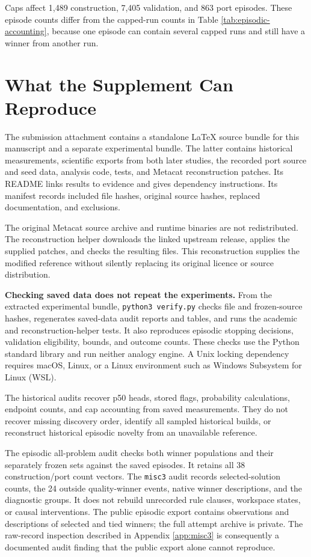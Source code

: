\documentclass[10pt,letterpaper]{article}
\begin{document}
Caps affect 1,489 construction, 7,405 validation, and 863 port episodes. These episode
counts differ from the capped-run counts in Table \ref{tab:episodic-accounting}, because
one episode can contain several capped runs and still have a winner from another run.

\clearpage

\section{What the Supplement Can Reproduce}\label{app:artifacts}

The submission attachment contains a standalone LaTeX source bundle for this manuscript
and a separate experimental bundle. The latter contains historical measurements,
scientific exports from both later studies, the recorded port source and seed data,
analysis code, tests, and Metacat reconstruction patches. Its README links results to
evidence and gives dependency instructions. Its manifest records included file hashes,
original source hashes, replaced documentation, and exclusions.

The original Metacat source archive and runtime binaries are not redistributed. The
reconstruction helper downloads the linked upstream release, applies the supplied patches,
and checks the resulting files. This reconstruction supplies the modified reference
without silently replacing its original licence or source distribution.

\textbf{Checking saved data does not repeat the experiments.} From the extracted
experimental bundle, \texttt{python3\ verify.py} checks file and frozen-source hashes,
regenerates saved-data audit reports and tables, and runs the academic and
reconstruction-helper tests. It also reproduces episodic stopping decisions, validation
eligibility, bounds, and outcome counts. These checks use the Python standard library and
run neither analogy engine. A Unix locking dependency requires macOS, Linux, or a Linux
environment such as Windows Subsystem for Linux (WSL).

The historical audits recover p50 heads, stored flags, probability calculations, endpoint
counts, and cap accounting from saved measurements. They do not recover missing discovery
order, identify all sampled historical builds, or reconstruct historical episodic novelty
from an unavailable reference.

The episodic all-problem audit checks both winner populations and their separately frozen
sets against the saved episodes. It retains all 38 construction/port count vectors. The
\texttt{misc3} audit records selected-solution counts, the 24 outside quality-winner
events, native winner descriptions, and the diagnostic groups. It does not rebuild
unrecorded rule clauses, workspace states, or causal interventions. The public episodic
export contains observations and descriptions of selected and tied winners; the full
attempt archive is private. The raw-record inspection described in Appendix
\ref{app:misc3} is consequently a documented audit finding that the public export alone
cannot reproduce.
\end{document}
